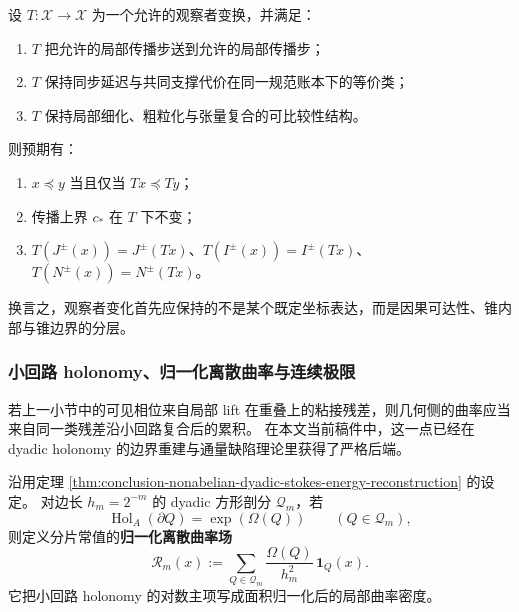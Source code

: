\begin{conjecture}[传播锥的观察者协变性]\label{conj:cdim-causal-cone-observer-covariance}
设 \(T:\mathcal X\to\mathcal X\) 为一个允许的观察者变换，并满足：
\begin{enumerate}
  \item \(T\) 把允许的局部传播步送到允许的局部传播步；
  \item \(T\) 保持同步延迟与共同支撑代价在同一规范账本下的等价类；
  \item \(T\) 保持局部细化、粗粒化与张量复合的可比较性结构。
\end{enumerate}
则预期有：
\begin{enumerate}
  \item \(x\preceq y\) 当且仅当 \(Tx\preceq Ty\)；
  \item 传播上界 \(c_*\) 在 \(T\) 下不变；
  \item \(T(J^\pm(x))=J^\pm(Tx)\)、\(T(I^\pm(x))=I^\pm(Tx)\)、\(T(N^\pm(x))=N^\pm(Tx)\)。
\end{enumerate}
换言之，观察者变化首先应保持的不是某个既定坐标表达，而是因果可达性、锥内部与锥边界的分层。
\end{conjecture}

\subsubsection{小回路 holonomy、归一化离散曲率与连续极限}
若上一小节中的可见相位来自局部 lift 在重叠上的粘接残差，则几何侧的曲率应当来自同一类残差沿小回路复合后的累积。
在本文当前稿件中，这一点已经在 dyadic holonomy 的边界重建与通量缺陷理论里获得了严格后端。

\begin{definition}\label{def:cdim-dyadic-normalized-holonomy-curvature}
沿用定理 \ref{thm:conclusion-nonabelian-dyadic-stokes-energy-reconstruction} 的设定。
对边长 \(h_m=2^{-m}\) 的 dyadic 方形剖分 \(\mathcal Q_m\)，若
\[
\operatorname{Hol}_A(\partial Q)=\exp(\Omega(Q))
\qquad (Q\in\mathcal Q_m),
\]
则定义分片常值的\textbf{归一化离散曲率场}
\[
\mathscr R_m(x)
:=
\sum_{Q\in\mathcal Q_m}
\frac{\Omega(Q)}{h_m^2}\,\mathbf 1_Q(x).
\]
它把小回路 holonomy 的对数主项写成面积归一化后的局部曲率密度。
\end{definition}


